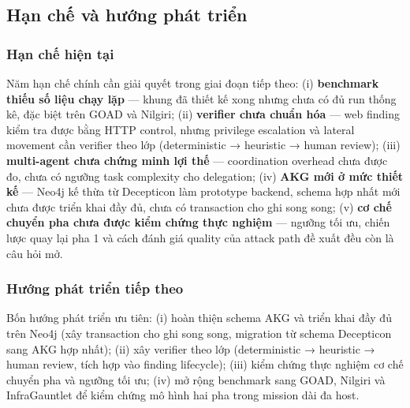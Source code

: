 \subsection{Hạn chế và hướng phát triển}
\label{sec:han-che-huong-phat-trien}

\subsubsection*{Hạn chế hiện tại}

Năm hạn chế chính cần giải quyết trong giai đoạn tiếp theo: (i) \textbf{benchmark thiếu số liệu chạy lặp} — khung đã thiết kế xong nhưng chưa có đủ run thống kê, đặc biệt trên GOAD và Nilgiri; (ii) \textbf{verifier chưa chuẩn hóa} — web finding kiểm tra được bằng HTTP control, nhưng privilege escalation và lateral movement cần verifier theo lớp (deterministic → heuristic → human review); (iii) \textbf{multi-agent chưa chứng minh lợi thế} — coordination overhead chưa được đo, chưa có ngưỡng task complexity cho delegation; (iv) \textbf{AKG mới ở mức thiết kế} --- Neo4j kế thừa từ Decepticon làm prototype backend, schema hợp nhất mới chưa được triển khai đầy đủ, chưa có transaction cho ghi song song; (v) \textbf{cơ chế chuyển pha chưa được kiểm chứng thực nghiệm} — ngưỡng tối ưu, chiến lược quay lại pha 1 và cách đánh giá quality của attack path đề xuất đều còn là câu hỏi mở.

\subsubsection*{Hướng phát triển tiếp theo}

Bốn hướng phát triển ưu tiên: (i) hoàn thiện schema AKG và triển khai đầy đủ trên Neo4j (xây transaction cho ghi song song, migration từ schema Decepticon sang AKG hợp nhất); (ii) xây verifier theo lớp (deterministic → heuristic → human review, tích hợp vào finding lifecycle); (iii) kiểm chứng thực nghiệm cơ chế chuyển pha và ngưỡng tối ưu; (iv) mở rộng benchmark sang GOAD, Nilgiri và InfraGauntlet để kiểm chứng mô hình hai pha trong mission dài đa host.

